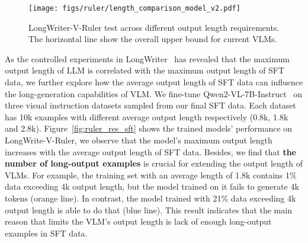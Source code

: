 \begin{figure}[t]
    \centering
    \texttt{[image: figs/ruler/length\_comparison\_model\_v2.pdf]}
    \caption{LongWriter-V-Ruler test across different output length requirements. The horizontal line show the overall upper bound for current VLMs.}
    \label{fig:ruler_res}
\end{figure}

As the controlled experiments in LongWriter~\cite{bai2024longwriter} has revealed that the maximum output length of LLM is correlated with the maximum output length of SFT data, we further explore how the average output length of SFT data can influence the long-generation capabilities of VLM. We fine-tune Qwen2-VL-7B-Instruct~\cite{wang2024qwen2} on three visual instruction datasets sampled from our final SFT data. Each dataset has 10k examples with different average output length respectively (0.8k, 1.8k and 2.8k). Figure~\ref{fig:ruler_res_sft} shows the trained models' performance on LongWrite-V-Ruler, we observe that the model's maximum output length increases with the average output length of SFT data. Besides, we find that \textbf{the number of long-output examples} is crucial for extending the output length of VLMs. For example, the training set with an average length of 1.8k contains 1\% data exceeding 4k output length, but the model trained on it fails to generate 4k tokens (orange line). In contrast, the model trained with 21\% data exceeding 4k output length is able to do that (blue line). This result indicates that the main reason that limits the VLM's output length is lack of enough long-output examples in SFT data.

